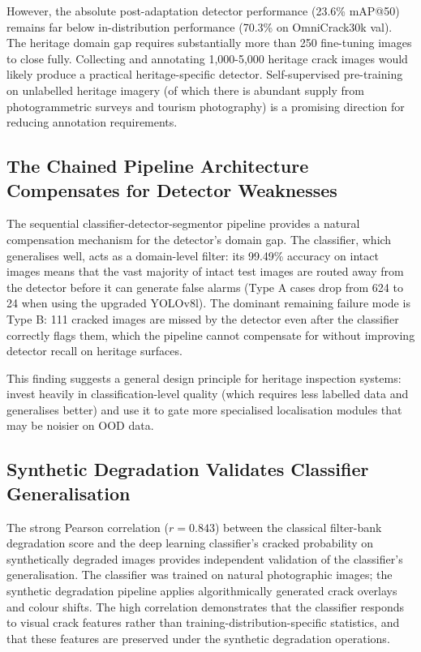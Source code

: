 \documentclass[12pt,a4paper]{article}
\begin{document}
However, the absolute post-adaptation detector performance (23.6\% mAP@50) remains far below in-distribution performance (70.3\% on OmniCrack30k val). The heritage domain gap requires substantially more than 250 fine-tuning images to close fully. Collecting and annotating 1,000-5,000 heritage crack images would likely produce a practical heritage-specific detector. Self-supervised pre-training on unlabelled heritage imagery (of which there is abundant supply from photogrammetric surveys and tourism photography) is a promising direction for reducing annotation requirements.

\subsection{The Chained Pipeline Architecture Compensates for Detector Weaknesses}

The sequential classifier-detector-segmentor pipeline provides a natural compensation mechanism for the detector's domain gap. The classifier, which generalises well, acts as a domain-level filter: its 99.49\% accuracy on intact images means that the vast majority of intact test images are routed away from the detector before it can generate false alarms (Type A cases drop from 624 to 24 when using the upgraded YOLOv8l). The dominant remaining failure mode is Type B: 111 cracked images are missed by the detector even after the classifier correctly flags them, which the pipeline cannot compensate for without improving detector recall on heritage surfaces.

This finding suggests a general design principle for heritage inspection systems: invest heavily in classification-level quality (which requires less labelled data and generalises better) and use it to gate more specialised localisation modules that may be noisier on OOD data.

\subsection{Synthetic Degradation Validates Classifier Generalisation}

The strong Pearson correlation ($r = 0.843$) between the classical filter-bank degradation score and the deep learning classifier's cracked probability on synthetically degraded images provides independent validation of the classifier's generalisation. The classifier was trained on natural photographic images; the synthetic degradation pipeline applies algorithmically generated crack overlays and colour shifts. The high correlation demonstrates that the classifier responds to visual crack features rather than training-distribution-specific statistics, and that these features are preserved under the synthetic degradation operations.
\end{document}

